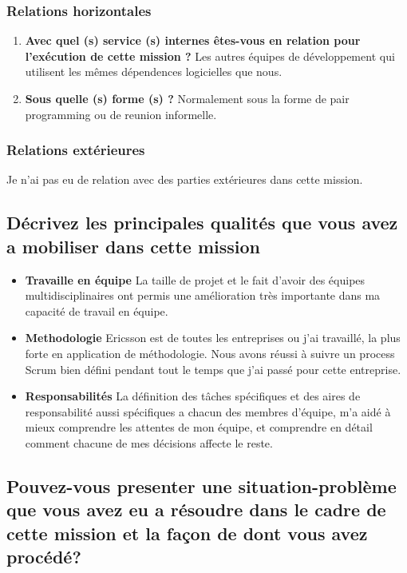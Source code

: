 \documentclass{resume} %
\begin{document}
	\subsubsection {Relations horizontales}	
	\begin{enumerate}
		\item \textbf{ Avec quel (s) service (s) internes êtes-vous en relation pour l'exécution de cette mission ?}
			Les autres équipes de développement qui utilisent les m\^emes d\'ependences logicielles que nous. 
		\item \textbf{Sous quelle (s) forme (s) ?}
			Normalement sous la forme de pair programming ou de reunion informelle.
	\end {enumerate}	

	\subsubsection {Relations extérieures}
		Je n'ai pas eu de relation avec des parties extérieures dans cette mission.
		
			
\subsection{Décrivez les principales qualités que vous avez a mobiliser dans cette mission}
	
		\begin{itemize} 				
			\item \textbf{Travaille en équipe} \newline
				La taille de projet et le fait d'avoir des équipes multidisciplinaires ont permis une amélioration très importante dans ma capacité de travail en équipe. 
			\item \textbf{Methodologie} \newline
				Ericsson est de toutes les entreprises ou j'ai travaill\'e, la plus forte en application de méthodologie. Nous avons réussi \`a suivre un process Scrum bien défini pendant tout le temps que j'ai passé pour cette entreprise.  
			\item \textbf{Responsabilités  } \newline
				La définition des tâches spécifiques et des aires de responsabilité aussi spécifiques a chacun des membres  d'équipe, m'a aidé \`a mieux comprendre les attentes de mon équipe, et comprendre en détail comment chacune de mes décisions affecte le reste.  
		\end{itemize}
		
\subsection{Pouvez-vous presenter une situation-problème que vous avez eu a résoudre dans le cadre de cette mission et la façon de dont vous avez procédé?}
\end{document}
